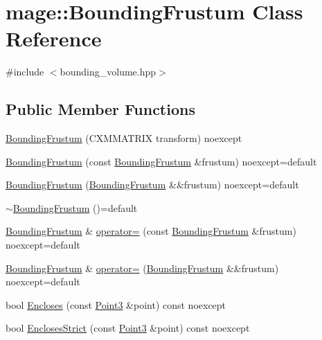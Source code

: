 \hypertarget{classmage_1_1_bounding_frustum}{}\section{mage\+:\+:Bounding\+Frustum Class Reference}
\label{classmage_1_1_bounding_frustum}


{\ttfamily \#include $<$bounding\+\_\+volume.\+hpp$>$}

\subsection*{Public Member Functions}
\begin{DoxyCompactItemize}
\item 
\hyperlink{classmage_1_1_bounding_frustum_afafc5433abc80e872242b5488ca0c835}{Bounding\+Frustum} (C\+X\+M\+M\+A\+T\+R\+IX transform) noexcept
\item 
\hyperlink{classmage_1_1_bounding_frustum_a22233ec36a176312dd453bbab682c313}{Bounding\+Frustum} (const \hyperlink{classmage_1_1_bounding_frustum}{Bounding\+Frustum} \&frustum) noexcept=default
\item 
\hyperlink{classmage_1_1_bounding_frustum_a0eafed7a78a72d33a6153bdcffd07057}{Bounding\+Frustum} (\hyperlink{classmage_1_1_bounding_frustum}{Bounding\+Frustum} \&\&frustum) noexcept=default
\item 
\hyperlink{classmage_1_1_bounding_frustum_a9837a92462da6a473f6ba5b7cc3b77fb}{$\sim$\+Bounding\+Frustum} ()=default
\item 
\hyperlink{classmage_1_1_bounding_frustum}{Bounding\+Frustum} \& \hyperlink{classmage_1_1_bounding_frustum_a713509c0c2e9e947bc448e2743903c12}{operator=} (const \hyperlink{classmage_1_1_bounding_frustum}{Bounding\+Frustum} \&frustum) noexcept=default
\item 
\hyperlink{classmage_1_1_bounding_frustum}{Bounding\+Frustum} \& \hyperlink{classmage_1_1_bounding_frustum_ae6a344dc47b0a8dffd49fc4a95c364a5}{operator=} (\hyperlink{classmage_1_1_bounding_frustum}{Bounding\+Frustum} \&\&frustum) noexcept=default
\item 
bool \hyperlink{classmage_1_1_bounding_frustum_a5a7b074f2d78031b235f4d5f31ef683a}{Encloses} (const \hyperlink{structmage_1_1_point3}{Point3} \&point) const noexcept
\item 
bool \hyperlink{classmage_1_1_bounding_frustum_aeae9c1be8cebf662ccd6615145724dec}{Encloses\+Strict} (const \hyperlink{structmage_1_1_point3}{Point3} \&point) const noexcept

\end{DoxyCompactItemize}
